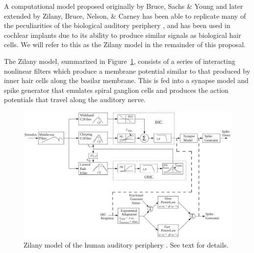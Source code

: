 \documentclass{article}
\begin{document}
A computational model proposed originally by
Bruce, Sachs \& Young
and later extended by Zilany, Bruce, Nelson, \& Carney
has been able to replicate
many of the peculiarities
of the biological auditory periphery
\citep{bruce2003,zilany2006,zilany2007,zilany2009,zilany2014},
and has been used in cochlear implants
due to its ability to produce
similar signals as biological hair cells.
We will refer to this as the
Zilany model in the remainder of this proposal.

The Zilany model,
summarized in Figure~\ref{fig:zilany},
consists of a series
of interacting nonlinear filters
which produce a membrane potential
similar to that produced
by inner hair cells along the basilar membrane.
This is fed into a synapse model and spike generator
that emulates spiral ganglion cells
and produces the action potentials
that travel along the auditory nerve.

\begin{figure}
  \begin{center}
    \includegraphics[width=1\linewidth]{zilany}
  \end{center}
  \caption{Zilany model of the human auditory periphery
    \citep{zilany2006}. See text for details.}
  \label{fig:zilany}
\end{figure}
\end{document}
